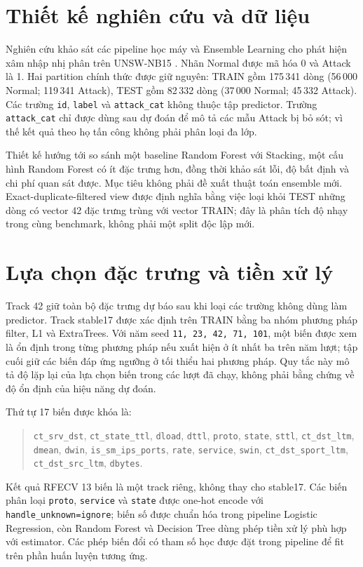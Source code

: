 \section{Thiết kế nghiên cứu và dữ liệu}
\label{sec:method-design}

Nghiên cứu khảo sát các pipeline học máy và Ensemble Learning cho phát hiện xâm nhập nhị phân trên UNSW-NB15 \cite{moustafa2015unsw}. Nhãn Normal được mã hóa 0 và Attack là 1. Hai partition chính thức được giữ nguyên: TRAIN gồm 175\,341 dòng (56\,000 Normal; 119\,341 Attack), TEST gồm 82\,332 dòng (37\,000 Normal; 45\,332 Attack). Các trường \texttt{id}, \texttt{label} và \texttt{attack\_cat} không thuộc tập predictor. Trường \texttt{attack\_cat} chỉ được dùng sau dự đoán để mô tả các mẫu Attack bị bỏ sót; vì thế kết quả theo họ tấn công không phải phân loại đa lớp.

Thiết kế hướng tới so sánh một baseline Random Forest với Stacking, một cấu hình Random Forest có ít đặc trưng hơn, đồng thời khảo sát lỗi, độ bất định và chi phí quan sát được. Mục tiêu không phải đề xuất thuật toán ensemble mới. Exact-duplicate-filtered view được định nghĩa bằng việc loại khỏi TEST những dòng có vector 42 đặc trưng trùng với vector TRAIN; đây là phân tích độ nhạy trong cùng benchmark, không phải một split độc lập mới.

\section{Lựa chọn đặc trưng và tiền xử lý}
\label{sec:method-feature-selection}

Track 42 giữ toàn bộ đặc trưng dự báo sau khi loại các trường không dùng làm predictor. Track stable17 được xác định trên TRAIN bằng ba nhóm phương pháp filter, L1 và ExtraTrees. Với năm seed \texttt{11, 23, 42, 71, 101}, một biến được xem là ổn định trong từng phương pháp nếu xuất hiện ở ít nhất ba trên năm lượt; tập cuối giữ các biến đáp ứng ngưỡng ở tối thiểu hai phương pháp. Quy tắc này mô tả độ lặp lại của lựa chọn biến trong các lượt đã chạy, không phải bằng chứng về độ ổn định của hiệu năng dự đoán.

Thứ tự 17 biến được khóa là:
\begin{quote}\small\raggedright
\texttt{ct\_srv\_dst}, \texttt{ct\_state\_ttl}, \texttt{dload}, \texttt{dttl},
\texttt{proto}, \texttt{state}, \texttt{sttl}, \texttt{ct\_dst\_ltm},
\texttt{dmean}, \texttt{dwin}, \texttt{is\_sm\_ips\_ports},
\texttt{rate}, \texttt{service}, \texttt{swin},
\texttt{ct\_dst\_sport\_ltm}, \texttt{ct\_dst\_src\_ltm}, \texttt{dbytes}.
\end{quote}
Kết quả RFECV 13 biến là một track riêng, không thay cho stable17. Các biến phân loại \texttt{proto}, \texttt{service} và \texttt{state} được one-hot encode với \texttt{handle\_unknown=ignore}; biến số được chuẩn hóa trong pipeline Logistic Regression, còn Random Forest và Decision Tree dùng phép tiền xử lý phù hợp với estimator. Các phép biến đổi có tham số học được đặt trong pipeline để fit trên phần huấn luyện tương ứng.

